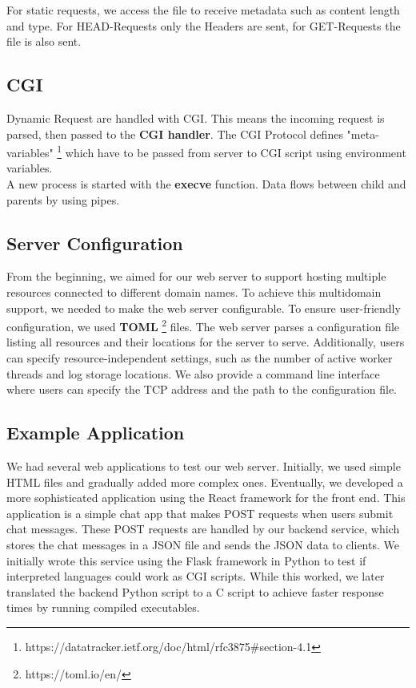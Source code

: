 For static requests, we access the file to receive metadata such as content length and type. For HEAD-Requests only the Headers are sent, for GET-Requests the file is also sent.  

\subsection*{CGI}
Dynamic Request are handled with CGI. This means the incoming request is parsed, then passed to the \textbf{CGI handler}. The CGI Protocol defines "meta-variables" \footnote{https://datatracker.ietf.org/doc/html/rfc3875#section-4.1} which have to be passed from server to CGI script using environment variables. \\

A new process is started with the \textbf{execve} function. Data flows between child and parents by using pipes. %

\subsection*{Server Configuration}
From the beginning, we aimed for our web server to support hosting multiple resources connected to different domain names. To achieve this multidomain support, we needed to make the web server configurable. To ensure user-friendly configuration, we used \textbf{TOML} \footnote{https://toml.io/en/} files. The web server parses a configuration file listing all resources and their locations for the server to serve. Additionally, users can specify resource-independent settings, such as the number of active worker threads and log storage locations. We also provide a command line interface where users can specify the TCP address and the path to the configuration file.

\subsection*{Example Application}

We had several web applications to test our web server. Initially, we used simple HTML files and gradually added more complex ones. Eventually, we developed a more sophisticated application using the React framework for the front end. This application is a simple chat app that makes POST requests when users submit chat messages. These POST requests are handled by our backend service, which stores the chat messages in a JSON file and sends the JSON data to clients. We initially wrote this service using the Flask framework in Python to test if interpreted languages could work as CGI scripts. While this worked, we later translated the backend Python script to a C script to achieve faster response times by running compiled executables. 

